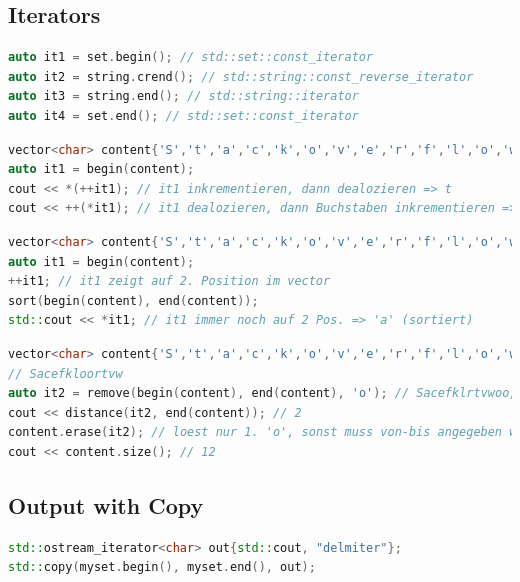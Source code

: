 \subsection{Iterators}
\begin{lstlisting}[language=C++]
auto it1 = set.begin(); // std::set::const_iterator
auto it2 = string.crend(); // std::string::const_reverse_iterator
auto it3 = string.end(); // std::string::iterator
auto it4 = set.end(); // std::set::const_iterator
\end{lstlisting}
\begin{lstlisting}[language=C++]
vector<char> content{'S','t','a','c','k','o','v','e','r','f','l','o','w'};
auto it1 = begin(content); 
cout << *(++it1); // it1 inkrementieren, dann dealozieren => t
cout << ++(*it1); // it1 dealozieren, dann Buchstaben inkrementieren => ++S => T
\end{lstlisting}
\begin{lstlisting}[language=C++]
vector<char> content{'S','t','a','c','k','o','v','e','r','f','l','o','w'};
auto it1 = begin(content); 
++it1; // it1 zeigt auf 2. Position im vector
sort(begin(content), end(content));
std::cout << *it1; // it1 immer noch auf 2 Pos. => 'a' (sortiert)
\end{lstlisting}
\begin{lstlisting}[language=C++]
vector<char> content{'S','t','a','c','k','o','v','e','r','f','l','o','w'};
// Sacefkloortvw
auto it2 = remove(begin(content), end(content), 'o'); // Sacefklrtvwoo, it2 zeigt auf 1. 'o'
cout << distance(it2, end(content)); // 2
content.erase(it2); // loest nur 1. 'o', sonst muss von-bis angegeben werden
cout << content.size(); // 12
\end{lstlisting}

\subsection{Output with Copy}
\begin{lstlisting}[language=C++]
std::ostream_iterator<char> out{std::cout, "delmiter"};
std::copy(myset.begin(), myset.end(), out);
\end{lstlisting}
